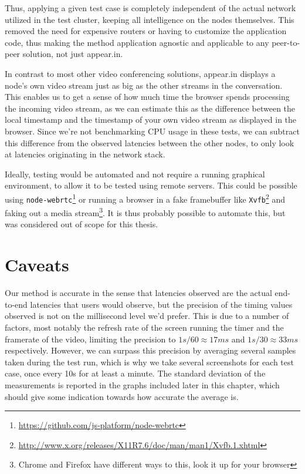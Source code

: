 Thus, applying a given test case is completely independent of the actual network utilized in the test cluster, keeping all intelligence on the nodes themselves. This removed the need for expensive routers or having to customize the application code, thus making the method application agnostic and applicable to any peer-to-peer solution, not just appear.in.

In contrast to most other video conferencing solutions, appear.in displays a node's own video stream just as big as the other streams in the conversation. This enables us to get a sense of how much time the browser spends processing the incoming video stream, as we can estimate this as the difference between the local timestamp and the timestamp of your own video stream as displayed in the browser. Since we're not benchmarking CPU usage in these tests, we can subtract this difference from the observed latencies between the other nodes, to only look at latencies originating in the network stack.

Ideally, testing would be automated and not require a running graphical environment, to allow it to be tested using remote servers. This could be possible using \texttt{node-webrtc}\footnote{\url{https://github.com/js-platform/node-webrtc}} or running a browser in a fake framebuffer like \texttt{Xvfb}\footnote{\url{http://www.x.org/releases/X11R7.6/doc/man/man1/Xvfb.1.xhtml}} and faking out a media stream\footnote{Chrome and Firefox have different ways to this, look it up for your browser}. It is thus probably possible to automate this, but was considered out of scope for this thesis.


\section{Caveats}

Our method is accurate in the sense that latencies observed are the actual end-to-end latencies that users would observe, but the precision of the timing values observed is not on the millisecond level we'd prefer. This is due to a number of factors, most notably the refresh rate of the screen running the timer and the framerate of the video, limiting the precision to $1s/60\approx17ms$ and $1s/30\approx33ms$ respectively. However, we can surpass this precision by averaging several samples taken during the test run, which is why we take several screenshots for each test case, once every 10s for at least a minute. The standard deviation of the measurements is reported in the graphs included later in this chapter, which should give some indication towards how accurate the average is.

